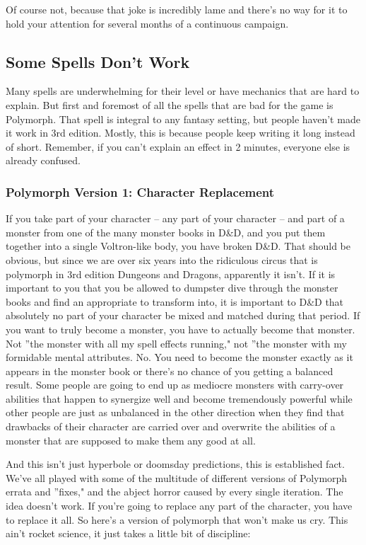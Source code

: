 Of course not, because that joke is incredibly lame and there's no way for it to hold your attention for several months of a continuous campaign.

\subsection{Some Spells Don't Work}

Many spells are underwhelming for their level or have mechanics that are hard to explain. But first and foremost of all the spells that are bad for the game is Polymorph. That spell is integral to any fantasy setting, but people haven't made it work in 3rd edition. Mostly, this is because people keep writing it long instead of short. Remember, if you can't explain an effect in 2 minutes, everyone else is already confused.

\subsubsection{Polymorph Version 1: Character Replacement}

If you take part of your character -- any part of your character -- and part of a monster from one of the many monster books in D\&D, and you put them together into a single Voltron-like body, you have broken D\&D. That should be obvious, but since we are over six years into the ridiculous circus that is polymorph in 3rd edition Dungeons and Dragons, apparently it isn't. If it is important to you that you be allowed to dumpster dive through the monster books and find an appropriate to transform into, it is important to D\&D that absolutely no part of your character be mixed and matched during that period. If you want to truly become a monster, you have to actually become that monster. Not ''the monster with all my spell effects running," not ''the monster with my formidable mental attributes. No. You need to become the monster exactly as it appears in the monster book or there's no chance of you getting a balanced result. Some people are going to end up as mediocre monsters with carry-over abilities that happen to synergize well and become tremendously powerful while other people are just as unbalanced in the other direction when they find that drawbacks of their character are carried over and overwrite the abilities of a monster that are supposed to make them any good at all.

And this isn't just hyperbole or doomsday predictions, this is established fact. We've all played with some of the multitude of different versions of Polymorph errata and ''fixes," and the abject horror caused by every single iteration. The idea doesn't work. If you're going to replace any part of the character, you have to replace it all. So here's a version of polymorph that won't make us cry. This ain't rocket science, it just takes a little bit of discipline:

